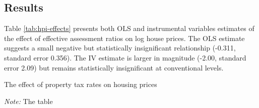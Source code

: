 \documentclass[11pt,article,oneside]{memoir}
\begin{document}
\hypertarget{results}{%
\subsection{Results}\label{results}}

Table \ref{tab:hpi-effects} presents both OLS and instrumental variables
estimates of the effect of effective assessment ratios on log house
prices. The OLS estimate suggests a small negative but statistically
insignificant relationship (-0.311, standard error 0.356). The IV
estimate is larger in magnitude (-2.00, standard error 2.09) but remains
statistically insignificant at conventional levels.

\begin{table}[htbp]

\caption{The effect of property tax rates on housing prices}\label{tab:hpi-effects}

\begin{footnotesize}
\begin{flushleft}
\emph{Note:  } The table 
\end{flushleft}
\end{footnotesize}


\end{table}


\end{document}
